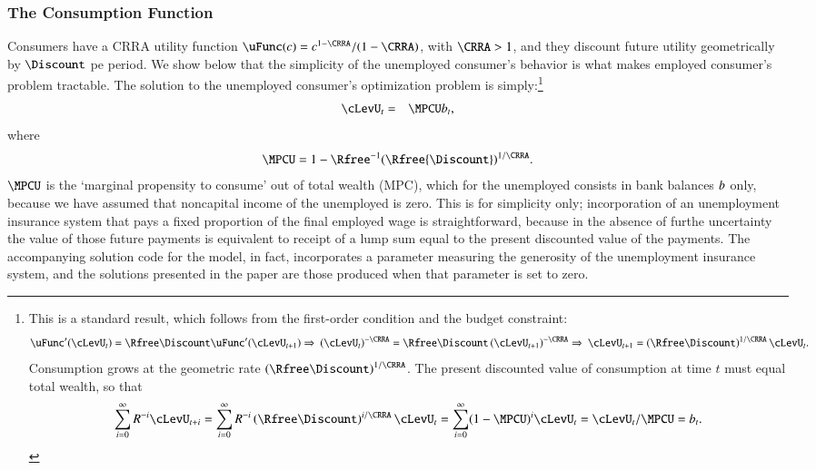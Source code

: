 \documentclass[titlepage,abstract]{\econtex}\newcommand{\texname}{ctDiscrete}
\begin{document}
\subsubsection{The Consumption Function }
Consumers have a CRRA utility function
$\uFunc(c)=c^{1-\CRRA}/(1-\CRRA)$, with $\CRRA>1$, and 
they discount future utility geometrically by $\Discount$ pe
period.  We show below that the simplicity of the unemployed consumer's behavior is what makes employed consumer's problem tractable. 
The solution to the unemployed consumer's optimization problem
is simply:\footnote{This is a standard result, which follows from the first-order condition and the budget constraint:
\begin{eqnarray*}
\uFunc^{\prime}(\cLevU_{t}) = \Rfree\Discount \uFunc^{\prime}(\cLevU_{t+1})
\Rightarrow \
\left(\cLevU_{t}\right)^{-\CRRA} = \Rfree\Discount \left(\cLevU_{t+1}\right)^{-\CRRA} 
\Rightarrow \
\cLevU_{t+1} = \left(\Rfree\Discount\right)^{1/\CRRA} \cLevU_{t}
.
\end{eqnarray*}
Consumption grows at the geometric rate $\left(\Rfree\Discount\right)^{1/\CRRA}$. The present discounted value of consumption at time $t$ must equal total wealth, so that
\begin{eqnarray*} 
\sum_{i=0}^{\infty} R^{-i} \cLevU_{t+i} = \sum_{i=0}^{\infty} R^{-i} \left(\Rfree\Discount\right)^{i/\CRRA} \cLevU_{t} = \sum_{i=0}^{\infty} (1-\MPCU)^{i} \cLevU_{t} = \cLevU_{t} / \MPCU =  \bLev_{t}.
\end{eqnarray*}
}
\begin{eqnarray}
  \cLevU_{t} & = & \MPCU \bLev_{t} 
\label{eq:cpfinfhorunemp}
\label{eq:cdel}
\label{eq:kappaDef}
,
\end{eqnarray}
where 
\begin{eqnarray}
  \MPCU = 1 - \Rfree^{-1}(\Rfree{\Discount})^{1/\CRRA}
\label{eq:MPCU}
.
\end{eqnarray}
$\MPCU$ is the `marginal propensity to consume' out of total wealth
(MPC), which for the unemployed consists in bank balances $b$ only, 
because we have assumed that noncapital income of the unemployed is
zero.  This is for simplicity only; incorporation of an unemployment
insurance system that pays a fixed proportion of the final employed
wage is straightforward, because in the absence of furthe
uncertainty the value of those future payments is equivalent to
receipt of a lump sum equal to the present discounted value of the
payments.  The accompanying solution code for the model, in fact,
incorporates a parameter measuring the generosity of the
unemployment insurance system, and the solutions presented in the
paper are those produced when that parameter is set to zero.
\end{document}
